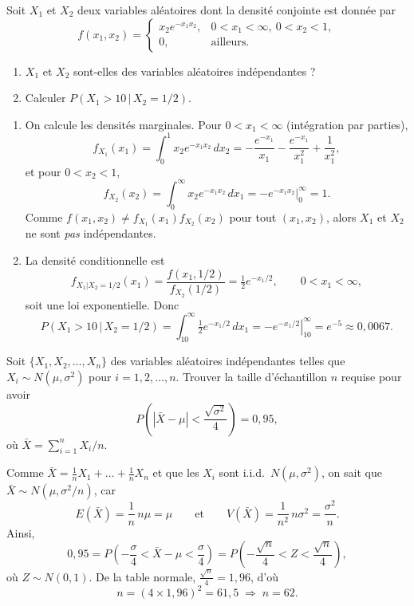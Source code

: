 \begin{exercice}
Soit $X_1$ et $X_2$ deux variables aléatoires dont la densité conjointe est donnée par
\[
  f(x_1,x_2)=\begin{cases} x_2e^{-x_1x_2}, & 0<x_1<\infty,\ 0<x_2<1,\\
  0, & \text{ailleurs}.\end{cases}
\]
\begin{enumerate}[label=(\alph*)]
  \item $X_1$ et $X_2$ sont-elles des variables aléatoires indépendantes ?
  \item Calculer $P(X_1>10\,|\,X_2=1/2)$.
\end{enumerate}
\begin{solution}
\begin{enumerate}[label=(\alph*)]
  \item On calcule les densités marginales. Pour $0<x_1<\infty$ (intégration par parties),
  \[
    f_{X_1}(x_1)=\int_{0}^{1}x_2e^{-x_1x_2}\,dx_2
    =-\frac{e^{-x_1}}{x_1}-\frac{e^{-x_1}}{x_1^2}+\frac{1}{x_1^2},
  \]
  et pour $0<x_2<1$,
  \[
    f_{X_2}(x_2)=\int_{0}^{\infty}x_2e^{-x_1x_2}\,dx_1
    =\left.-e^{-x_1x_2}\right|_{0}^{\infty}=1.
  \]
  Comme $f(x_1,x_2)\neq f_{X_1}(x_1)f_{X_2}(x_2)$ pour tout $(x_1,x_2)$, alors $X_1$ et $X_2$
  ne sont \emph{pas} indépendantes.
  \item La densité conditionnelle est
  \[
    f_{X_1|X_2=1/2}(x_1)=\frac{f(x_1,1/2)}{f_{X_2}(1/2)}
    =\tfrac12 e^{-x_1/2},\qquad 0<x_1<\infty,
  \]
  soit une loi exponentielle. Donc
  \[
    P(X_1>10\,|\,X_2=1/2)=\int_{10}^{\infty}\tfrac12 e^{-x_1/2}\,dx_1
    =\left.-e^{-x_1/2}\right|_{10}^{\infty}=e^{-5}\approx 0,0067.
  \]
\end{enumerate}
\end{solution}
\end{exercice}


\begin{exercice}
Soit $\{X_1,X_2,\dots,X_n\}$ des variables aléatoires indépendantes telles que
$X_i\sim N(\mu,\sigma^2)$ pour $i=1,2,\dots,n$. Trouver la taille d'échantillon $n$ requise
pour avoir
\[
  P\!\left(|\bar X-\mu|<\frac{\sqrt{\sigma^2}}{4}\right)=0,95,
\]
où $\bar X=\sum_{i=1}^{n}X_i/n$.
\begin{solution}
Comme $\bar X=\frac1n X_1+\dots+\frac1n X_n$ et que les $X_i$ sont i.i.d.\ $N(\mu,\sigma^2)$,
on sait que $\bar X\sim N(\mu,\sigma^2/n)$, car
\[
  E(\bar X)=\frac1n\,n\mu=\mu
  \qquad\text{et}\qquad
  V(\bar X)=\frac{1}{n^2}\,n\sigma^2=\frac{\sigma^2}{n}.
\]
Ainsi,
\[
  0,95=P\!\left(-\frac{\sigma}{4}<\bar X-\mu<\frac{\sigma}{4}\right)
  =P\!\left(-\frac{\sqrt n}{4}<Z<\frac{\sqrt n}{4}\right),
\]
où $Z\sim N(0,1)$. De la table normale, $\frac{\sqrt n}{4}=1,96$, d'où
\[
  n=(4\times 1,96)^2=61,5\;\Longrightarrow\;n=62.
\]
\end{solution}
\end{exercice}


